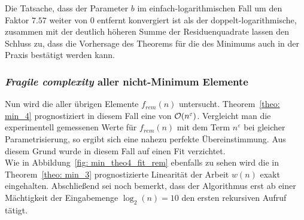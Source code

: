 \noindent
Die Tatsache, dass der Parameter $b$ im einfach-logarithmischen Fall um den Faktor $7.57$ weiter von $0$ entfernt konvergiert ist als der doppelt-logarithmische, zusammen mit der deutlich höheren Summe der Residuenquadrate lassen den Schluss zu, dass die Vorhersage des Theorems für die \fg des Minimums \fgm auch in der Praxis bestätigt werden kann.

\subsubsection*{\textit{Fragile complexity} aller nicht-Minimum Elemente}
Nun wird die \fg aller übrigen Elemente $f_{rem}(n)$ untersucht. Theorem~\ref{theo: min_4} prognostiziert in diesem Fall eine \fg von $\mathcal{O}(n^{\varepsilon})$. Vergleicht man die experimentell gemessenen Werte für  $f_{rem}(n)$ mit dem Term $n^{\varepsilon}$ bei gleicher Parametrisierung, so ergibt sich eine nahezu perfekte Übereinstimmung. Aus diesem Grund wurde in diesem Fall auf einen Fit verzichtet.\\[.1cm]

\noindent
Wie in Abbildung~\ref{fig: min_theo4_fit_rem} ebenfalls zu sehen wird die in Theorem~\ref{theo: min_3} prognostizierte Linearität der Arbeit $w(n)$ exakt eingehalten. Abschließend sei noch bemerkt, dass der Algorithmus erst ab einer Mächtigkeit der Eingabemenge $\log_2(n)=10$ den ersten rekursiven Aufruf tätigt.


